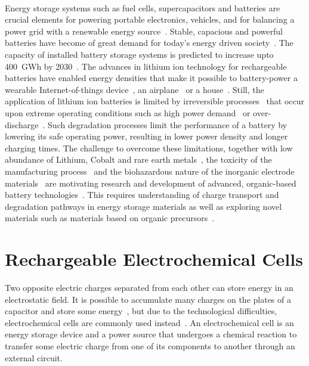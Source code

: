 \paragraph*{}
Energy storage systems such as fuel cells, supercapacitors and batteries are crucial elements for powering portable electronics, vehicles, and for balancing a power grid with a renewable energy source~\cite{janoschka2012_advmater,Ghoniem_2011}. Stable, capacious and powerful batteries have become of great demand for today's energy driven society~\cite{Yoo2014,Xu2020,Nitta2015}. The capacity of installed battery storage systems is predicted to increase upto 400~GWh by 2030~\cite{Figgener_2020}. The advances in lithium ion technology for rechargeable batteries have enabled energy densities that make it possible to battery-power a wearable Internet-of-things device~\cite{Lee2013,Maddikunta2020}, an airplane~\cite{Kadlec2014} or a house~\cite{Diouf2019,Hirasawa2021}. Still, the application of lithium ion batteries is limited by irreversible processes~\cite{Larsson2017,Fu2015,Zhang2021} that occur upon extreme operating conditions such as high power demand~\cite{Zhang2022,Guan2018} or over-discharge~\cite{Ma2020}. Such degradation processes limit the performance of a battery by lowering its safe operating power, resulting in lower power density and longer charging times. The challenge to overcome these limitations, together with low abundance of Lithium, Cobalt and rare earth metals~\cite{Xu2020,janoschka2012_advmater}, the toxicity of the manufacturing process~\cite{Prazanov2022,Peters2017} and the biohazardous nature of the inorganic electrode materials~\cite{Casado_2021_book} are motivating research and development of advanced, organic-based battery technologies~\cite{Degen2022}. This requires understanding of charge transport and degradation pathways in energy storage materials as well as exploring novel materials such as materials based on organic precursors~\cite{Lu2020,Kim2023}.\\

\section{Rechargeable Electrochemical Cells}
Two opposite electric charges separated from each other can store energy in an electrostatic field. It is possible to accumulate many charges on the plates of a capacitor and store some energy~\cite{He_2022}, but due to the technological difficulties, electrochemical cells are commonly used instead~\cite{Figgener_2020}. An electrochemical cell is an energy storage device and a power source that undergoes a chemical reaction to transfer some electric charge from one of its components to another through an external circuit. 

